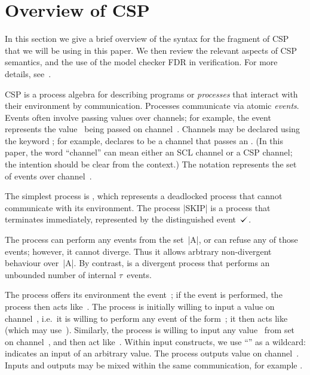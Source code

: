 \section{Overview of CSP} 
\label{sec:csp}

In this section we give a brief overview of the syntax for the fragment of CSP
that we will be using in this paper.  We then review the relevant aspects of
CSP semantics, and the use of the model checker FDR in verification.  For more
details, see~\cite{awr:UCS}.

CSP is a process algebra for describing programs or {\em processes}\/ that
interact with their environment by communication.  Processes communicate via
atomic \emph{events}.  Events often involve passing values over channels; for
example, the event  represents the value~ being passed on
channel~.  Channels may be declared using the keyword ;
for example,  declares  to be a channel that
passes an .  (In this paper, the word ``channel'' can mean either an
SCL channel or a CSP channel; the intention should be clear from the context.)
The notation  represents the set of events over
channel~.

The simplest process is , which represents a deadlocked process that
cannot communicate with its environment.  The process |SKIP| is a process that
terminates immediately, represented by the distinguished event~$\tick$. 

The process  can perform any events from the set~|A|, or can
refuse any of those events; however, it cannot diverge.  Thus it allows
arbtrary non-divergent behaviour over~|A|.  By contrast,  is a
divergent process that performs an unbounded number of internal $\tau$~events.

The process  offers its environment the event~; if the
event is performed, the process then acts like~.  The process
 is initially willing to input a value  on
channel~, i.e.~it is willing to perform any event of the
form~; it then acts like~ (which may use~).
Similarly, the process  is willing to input any
value~ from set~ on channel~, and then act
like~.  Within input constructs, we use ``\CSPM{_}'' as a wildcard:
 indicates an input of an arbitrary value.  The process  outputs value  on channel~.  Inputs and outputs may be
mixed within the same communication, for example .

